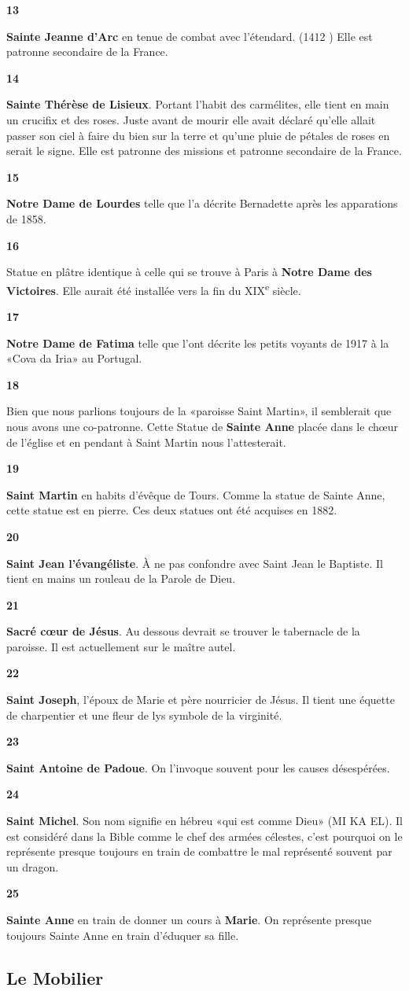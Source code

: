 \documentclass[a5paper, 9pt]{extarticle}
\newcommand{\linednote}[2]{
  \noindent
  \parbox[t]{0.9cm}{\small \textbf{#1}}%
  \parbox[t]{\dimexpr\linewidth-0.9cm}{\normalsize #2 \vspace{0.4em}}
  \newline
}
\begin{document}
\linednote{13}{\textbf{Sainte Jeanne d'Arc} en tenue de combat avec l'étendard.
(1412 \Cross 1431) Elle est patronne secondaire de la France.}
\linednote{14}{\textbf{Sainte Thérèse de Lisieux}. Portant l'habit des
carmélites, elle tient en main un crucifix et des roses. Juste avant
de mourir elle avait déclaré qu'elle allait passer son ciel à faire du
bien sur la terre et qu'une pluie de pétales de roses en serait le
signe. Elle est patronne des missions et patronne secondaire de la
France.}
\linednote{15}{\textbf{Notre Dame de Lourdes} telle que l'a décrite Bernadette
  après les apparations de 1858.}
\linednote{16}{Statue en plâtre identique à celle qui se trouve à
  Paris à \textbf{Notre Dame des \mbox{Victoires}}. Elle aurait été
  installée vers la fin du \textsc{XIX}\textsuperscript{e} siècle.}
\linednote{17}{\textbf{Notre Dame de Fatima} telle que l'ont décrite les petits
voyants de 1917 à la «Cova da Iria» au Portugal.}
\linednote{18}{Bien que nous parlions toujours de la «paroisse Saint
Martin», il semblerait que nous avons une co-patronne. Cette Statue de
\textbf{Sainte Anne} placée dans le chœur de l'église et en pendant à Saint
Martin nous l'attesterait.}
\linednote{19}{\textbf{Saint Martin} en habits d'évêque de Tours. Comme la
statue de Sainte Anne, cette statue est en pierre. Ces deux statues
ont été acquises en 1882.}
\linednote{20}{\textbf{Saint Jean l'évangéliste}. À ne pas confondre avec Saint
Jean le Baptiste. Il tient en mains un rouleau de la Parole de Dieu.}
\linednote{21}{\textbf{Sacré cœur de Jésus}. Au dessous devrait se trouver le
tabernacle de la paroisse. Il est actuellement sur le maître autel.}
\linednote{22}{\textbf{Saint Joseph}, l'époux de Marie et père nourricier de
Jésus. Il tient une équette de charpentier et une fleur de lys symbole
de la virginité.}
\linednote{23}{\textbf{Saint Antoine de Padoue}. On l'invoque souvent pour les
causes désespérées.}
\linednote{24}{\textbf{Saint Michel}. Son nom signifie en hébreu «qui est comme
Dieu» (MI KA EL). Il est considéré dans la Bible comme le chef des
armées célestes, c'est pourquoi on le représente presque toujours en
train de combattre le mal représenté souvent par un dragon.}
\linednote{25}{\textbf{Sainte Anne} en train de donner un cours à
  \textbf{Marie}. On représente presque toujours Sainte Anne en train
  d'éduquer sa fille.}

\subsection*{Le Mobilier}
\end{document}
